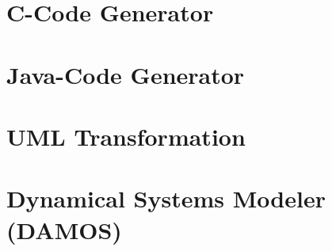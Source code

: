 \documentclass[12pt,ngerman, a4paper]{book}
\begin{document}
\chapter{C-Code Generator}
\label{sec:CCodeGenerator}



\chapter{Java-Code Generator}
\label{sec:JavaCodeGenerator}






\chapter{UML Transformation}
\label{sec:UMLTransformation}


\chapter{Dynamical Systems Modeler (DAMOS)}
\label{sec:Damos}


%

%
\end{document}
